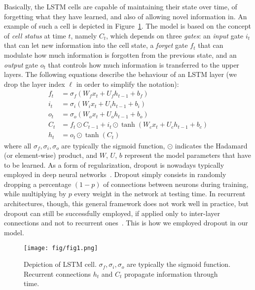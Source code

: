 \documentclass[journal]{IEEEtran}
\begin{document}
Basically, the LSTM cells are capable of maintaining their state over time, of forgetting what they have learned, and also of allowing novel information in.
%
An example of such a cell is depicted in Figure~\ref{fig:lstm}. The model is based on the concept of \textit{cell status} at time $t$, namely $C_t$, which depends on three \textit{gates}: an \textit{input} gate $i_t$ that can let new information into the cell state, a \textit{forget} gate $f_t$ that can modulate how much information is forgotten from the previous state, and an \textit{output} gate $o_t$ that controls how much information is transferred to the upper layers.
%
The following equations describe the behaviour of an LSTM layer (we drop the layer index $\ell$ in order to simplify the notation):
%
\begin{align}
  f_t &= \sigma_f (W_f x_t + U_f h_{t-1} + b_f)\\
  i_t &= \sigma_i (W_i x_t + U_i h_{t-1} + b_i)\\
  o_t &= \sigma_o (W_o x_t + U_o h_{t-1} + b_o)\\
  C_t &= f_t \odot C_{t-1} + i_t \odot \tanh (W_c x_t + U_c h_{t-1} + b_c)\\
  h_t &= o_t \odot \tanh(C_t)
\end{align}
%
where all $\sigma_f, \sigma_i, \sigma_o$ are typically the sigmoid function, $\odot$ indicates the Hadamard (or element-wise) product, and $W$, $U$, $b$ represent the model parameters that have to be learned. As a form of regularization, dropout is nowadays typically employed in deep neural networks~\cite{Srivastava2014}. Dropout simply consists in randomly dropping a percentage $(1-p)$ of connections between neurons during training, while multiplying by $p$ every weight in the network at testing time. In recurrent architectures, though, this general framework does not work well in practice, but dropout can still be successfully employed, if applied only to inter-layer connections and not to recurrent ones~\cite{Zaremba2014}. This is how we employed dropout in our model.

\begin{figure}
\begin{center}
\texttt{[image: fig/fig1.png]}
\caption{Depiction of LSTM cell. $\sigma_f, \sigma_i, \sigma_o$ are typically the sigmoid function. Recurrent connections $h_t$ and $C_t$ propagate information through time.\label{fig:lstm}}
\end{center}
\end{figure}
\end{document}
